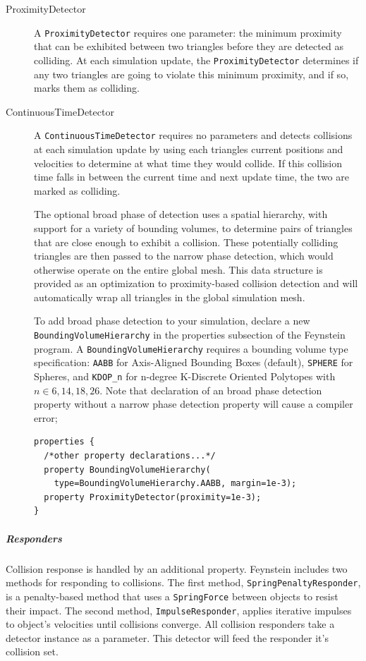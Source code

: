 \begin{description}
\item[ProximityDetector] A \texttt{ProximityDetector} requires one
  parameter: the minimum proximity that can be exhibited between two
  triangles before they are detected as colliding. At each simulation
  update, the \texttt{ProximityDetector} determines if any two
  triangles are going to violate this minimum proximity, and if so,
  marks them as colliding.

\item[ContinuousTimeDetector] A \texttt{ContinuousTimeDetector}
  requires no parameters and detects collisions at each simulation
  update by using each triangles current positions and velocities to
  determine at what time they would collide. If this collision time
  falls in between the current time and next update time, the two are
  marked as colliding.

  The optional broad phase of detection uses a spatial hierarchy, with
  support for a variety of bounding volumes, to determine pairs of
  triangles that are close enough to exhibit a collision. These
  potentially colliding triangles are then passed to the narrow phase
  detection, which would otherwise operate on the entire global
  mesh. This data structure is provided as an optimization to
  proximity-based collision detection and will automatically wrap all
  triangles in the global simulation mesh.

  To add broad phase detection to your simulation, declare a new
  \texttt{Bounding\-Volume\-Hierarchy} in the properties subsection of
  the Feynstein program. A \texttt{Bounding\-Volume\-Hierarchy}
  requires a bounding volume type specification: \texttt{AABB} for
  Axis-Aligned Bounding Boxes (default), \texttt{SPHERE} for Spheres,
  and \texttt{KDOP\_n} for n-degree K-Discrete Oriented Polytopes with
  $n \in {6, 14, 18, 26}$. Note that declaration of an broad phase
  detection property without a narrow phase detection property will
  cause a compiler error;

\begin{verbatim}
properties {
  /*other property declarations...*/
  property BoundingVolumeHierarchy(
    type=BoundingVolumeHierarchy.AABB, margin=1e-3);
  property ProximityDetector(proximity=1e-3);
}
\end{verbatim}
\end{description}

\subparagraph{Responders}

Collision response is handled by an additional property. Feynstein
includes two methods for responding to collisions. The first method, \texttt{SpringPenaltyResponder},  is a penalty-based method that uses a \texttt{SpringForce} between objects to resist their impact. The second method, \texttt{ImpulseResponder}, applies iterative impulses to object's velocities until collisions converge. All collision responders take a detector instance as a parameter. This detector will feed the responder it's collision set.

